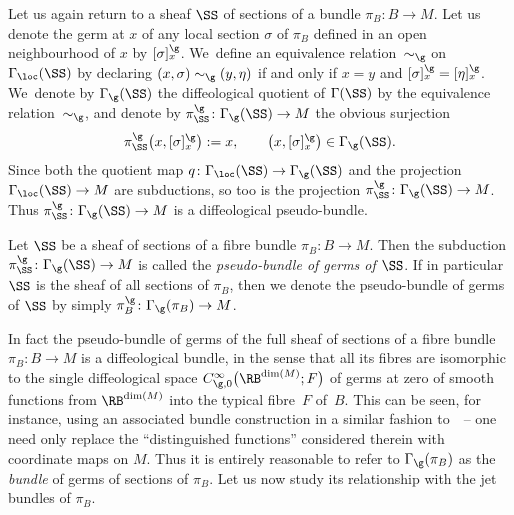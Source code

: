 Let us again return to a sheaf $\SS$ of sections of a bundle $\pi_{B}\colon B\rightarrow M$. Let us denote the germ at $x$ of any local section $\sigma$ of $\pi_{B}$ defined in an open neighbourhood of $x$ by $[\sigma]_{x}^{\g}$. We~define an equivalence relation~$\sim_{\g}$ on $\Gamma_{\loc}(\SS)$ by declaring $(x,\sigma)\sim_{\g}(y,\eta)$ if and only if $x = y$ and $[\sigma]^{\g}_{x} = [\eta]^{\g}_{x}$. We~denote by $\Gamma_{\g}(\SS)$ the diffeological quotient of $\Gamma(\SS)$ by the equivalence relation~$\sim_{\g}$, and denote by $\pi_{\SS}^{\g}\colon \Gamma_{\g}(\SS)\rightarrow M$ the obvious surjection
\begin{gather*}
\pi_{\SS}^{\g}\big(x,[\sigma]^{\g}_{x}\big):=x,\qquad \big(x,[\sigma]^{\g}_{x}\big)\in\Gamma_{\g}(\SS).
\end{gather*}
Since both the quotient map $q\colon \Gamma_{\loc}(\SS)\rightarrow\Gamma_{\g}(\SS)$ and the projection $\Gamma_{\loc}(\SS)\rightarrow M$ are subductions, so too is the projection $\pi_{\SS}^{\g}\colon \Gamma_{\g}(\SS)\rightarrow M$. Thus $\pi_{\SS}^{\g}\colon \Gamma_{\g}(\SS)\rightarrow M$ is a diffeological pseudo-bundle.

\begin{Definition}
Let $\SS$ be a sheaf of sections of a fibre bundle $\pi_{B}\colon B\rightarrow M$. Then the subduction $\pi_{\SS}^{\g}\colon \Gamma_{\g}(\SS)\rightarrow M$ is called the \textit{pseudo-bundle of germs of $\SS$}. If in particular $\SS$ is the sheaf of all sections of $\pi_{B}$, then we denote the pseudo-bundle of germs of $\SS$ by simply $\pi_{B}^{\g}\colon \Gamma_{\g}(\pi_{B})\rightarrow M$.
\end{Definition}

In fact the pseudo-bundle of germs of the full sheaf of sections of a fibre bundle $\pi_{B}\colon B\rightarrow M$ is a diffeological bundle, in the sense that all its fibres are isomorphic to the single diffeological space $C_{\g,0}^{\infty}\big(\RB^{\dim(M)};F\big)$ of germs at zero of smooth functions from $\RB^{\dim(M)}$ into the typical fibre~$F$ of~$B$. This can be seen, for instance, using an associated bundle construction in a similar fashion to~\cite[Remark 5.7]{mac3}~-- one need only replace the ``distinguished functions'' considered therein with coordinate maps on $M$. Thus it is entirely reasonable to refer to $\Gamma_{\g}(\pi_{B})$ as the \textit{bundle} of germs of sections of $\pi_{B}$. Let us now study its relationship with the jet bundles of $\pi_{B}$.

